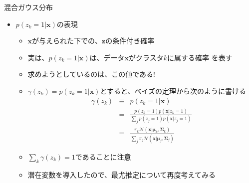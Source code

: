 \documentclass[dvipdfmx,notheorems,t]{beamer}
\begin{document}
\begin{frame}{混合ガウス分布}

\begin{itemize}
	\item $p(z_k = 1 | \bm{x})$の表現
	\begin{itemize}
		\item $\bm{x}$が与えられた下での、$\bm{z}$の条件付き確率
		\item 実は、$p(z_k = 1 | \bm{x})$は、\color{red}データ$\bm{x}$がクラスタ$k$に属する確率 \normalcolor を表す
		\item \alert{求めようとしているのは、この値である!}
		\newline
		\item $\gamma(z_k) = p(z_k = 1 | \bm{x})$とすると、ベイズの定理から次のように書ける
		\begin{eqnarray}
			\gamma(z_k) &\equiv& p(z_k = 1 | \bm{x}) \\
			&=& \frac{p(z_k = 1) p(\bm{x} | z_k = 1)}{\sum_j p(z_j = 1) p(\bm{x} | z_j = 1)} \nonumber \\
			&=& \frac{\pi_k \mathcal{N}(\bm{x} | \bm{\mu}_k, \bm{\Sigma}_k)}{\sum_j \pi_j \mathcal{N}(\bm{x} | \bm{\mu}_j, \bm{\Sigma}_j)}
		\end{eqnarray}
		\item $\sum_k \gamma(z_k) = 1$であることに注意
		\newline
		\item 潜在変数を導入したので、最尤推定について再度考えてみる
	\end{itemize}
\end{itemize}

\end{frame}
\end{document}
